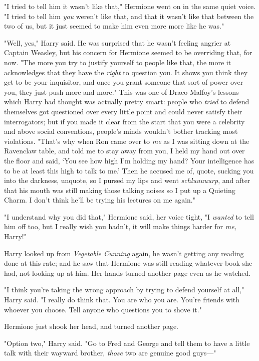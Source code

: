 "I tried to tell him it wasn't like that," Hermione went on in the same quiet
voice. "I tried to tell him \emph{you} weren't like that, and that it wasn't
like that between the two of us, but it just seemed to make him even
more{\el} more like he was."

"Well, yes," Harry said. He was surprised that he wasn't feeling angrier at
Captain Weasley, but his concern for Hermione seemed to be overriding that, for
now. "The more you try to justify yourself to people like that, the more it
acknowledges that they have the \emph{right} to question you. It shows you
think they get to be your inquisitor, and once you grant someone that sort of
power over you, they just push more and more." This was one of Draco Malfoy's
lessons which Harry had thought was actually pretty smart: people who
\emph{tried} to defend themselves got questioned over every little point and
could never satisfy their interrogators; but if you made it clear from the
start that you were a celebrity and above social conventions, people's minds
wouldn't bother tracking most violations. "That's why when Ron came over to
\emph{me} as I was sitting down at the Ravenclaw table, and told me to stay
away from you, I held my hand out over the floor and said, `You see how high
I'm holding my hand? Your intelligence has to be at least this high to talk to
me.' Then he accused me of, quote, sucking you into the darkness, unquote, so I
pursed my lips and went \emph{schluuuuurp}, and after that his mouth was still
making those talking noises so I put up a Quieting Charm. I don't think he'll
be trying his lectures on me again."

"I understand why you did that," Hermione said, her voice tight, "I
\emph{wanted} to tell him off too, but I really wish you hadn't, it will make
things harder for \emph{me,} Harry!"

Harry looked up from \emph{Vegetable Cunning} again, he wasn't getting any
reading done at this rate; and he saw that Hermione was still reading whatever
book she had, not looking up at him. Her hands turned another page even as he
watched.

"I think you're taking the wrong approach by trying to defend yourself at all,"
Harry said. "I really do think that. You are who you are. You're friends with
whoever you choose. Tell anyone who questions you to shove it."

Hermione just shook her head, and turned another page.

"Option two," Harry said. "Go to Fred and George and tell them to have a little
talk with their wayward brother, \emph{those} two are genuine good guys\mbox{---}"

